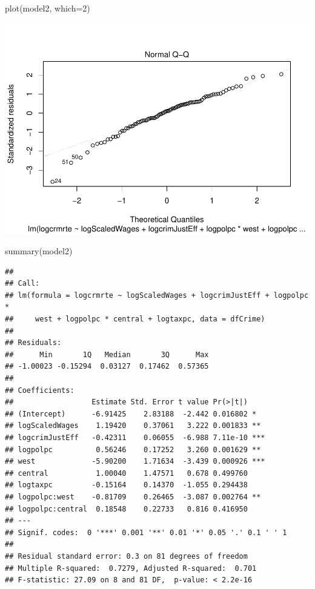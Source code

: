 \documentclass[]{article}
\newenvironment{Shaded}{}{}
\newcommand{\DataTypeTok}[1]{#1}
\newcommand{\DecValTok}[1]{#1}
\newcommand{\KeywordTok}[1]{\textcolor[rgb]{0.00,0.00,1.00}{#1}}
\newcommand{\NormalTok}[1]{#1}
\begin{document}
\begin{Shaded}
\begin{Highlighting}[]
\KeywordTok{plot}\NormalTok{(model2, }\DataTypeTok{which=}\DecValTok{2}\NormalTok{)}
\end{Highlighting}
\end{Shaded}

\includegraphics{Bagnard_Gaustad_Hartman_Leung_Lab_3_files/figure-latex/unnamed-chunk-76-1.pdf}

\begin{Shaded}
\begin{Highlighting}[]
\KeywordTok{summary}\NormalTok{(model2)}
\end{Highlighting}
\end{Shaded}

\begin{verbatim}
## 
## Call:
## lm(formula = logcrmrte ~ logScaledWages + logcrimJustEff + logpolpc * 
##     west + logpolpc * central + logtaxpc, data = dfCrime)
## 
## Residuals:
##      Min       1Q   Median       3Q      Max 
## -1.00023 -0.15294  0.03127  0.17462  0.57365 
## 
## Coefficients:
##                  Estimate Std. Error t value Pr(>|t|)    
## (Intercept)      -6.91425    2.83188  -2.442 0.016802 *  
## logScaledWages    1.19420    0.37061   3.222 0.001833 ** 
## logcrimJustEff   -0.42311    0.06055  -6.988 7.11e-10 ***
## logpolpc          0.56246    0.17252   3.260 0.001629 ** 
## west             -5.90200    1.71634  -3.439 0.000926 ***
## central           1.00040    1.47571   0.678 0.499760    
## logtaxpc         -0.15164    0.14370  -1.055 0.294438    
## logpolpc:west    -0.81709    0.26465  -3.087 0.002764 ** 
## logpolpc:central  0.18548    0.22733   0.816 0.416950    
## ---
## Signif. codes:  0 '***' 0.001 '**' 0.01 '*' 0.05 '.' 0.1 ' ' 1
## 
## Residual standard error: 0.3 on 81 degrees of freedom
## Multiple R-squared:  0.7279, Adjusted R-squared:  0.701 
## F-statistic: 27.09 on 8 and 81 DF,  p-value: < 2.2e-16
\end{verbatim}
\end{document}
